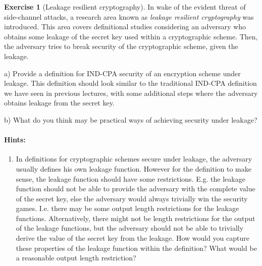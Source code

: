 \documentclass[envcountsame,runningheads,notitlepage]{../llncs}
\theoremstyle{definition}
\newtheorem{graded}[crossed]{Exercise}
\begin{document}
\begin{graded}[Leakage resilient cryptography]
In wake of the evident threat of side-channel attacks, a research area known as \emph{leakage resilient cryptography} was introduced. This area covers definitional studies considering an adversary who obtains some leakage of the secret key used within a cryptographic scheme. Then, the adversary tries to break security of the cryptographic scheme, given the leakage.

\begin{description}
\item{a)} Provide a definition for IND-CPA security of an encryption scheme under leakage. This definition should look similar to the traditional IND-CPA definition we have seen in previous lectures, with some additional steps where the adversary obtains leakage from the secret key.

\item{b)} What do you think may be practical ways of achieving security under leakage? 

\end{description}

\paragraph{Hints:}
\begin{enumerate}
\item In definitions for cryptographic schemes secure under leakage, the adversary usually defines his own leakage function. However for the definition to make sense, the leakage function should have some restrictions. E.g. the leakage function should not be able to provide the adversary with the complete value of the secret key, else the adversary would always trivially win the security games. I.e. there may be some output length restrictions for the leakage functions. Alternatively, there might not be length restrictions for the output of the leakage functions, but the adversary should not be able to trivially derive the value of the secret key from the leakage. How would you capture these properties of the leakage function within the definition? What would be a reasonable output length restriction?

\end{enumerate}
\end{graded}
\end{document}
